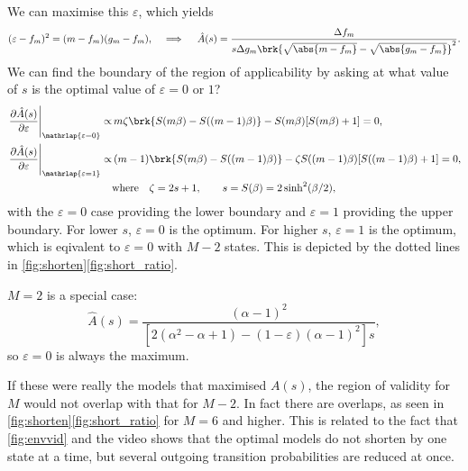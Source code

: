 \documentclass[12pt]{article}
\renewcommand{\pdiff}[2]{\frac{\partial #1}{\partial #2}}
\begin{document}
We can maximise this \wrt \(\varepsilon\), which yields
%
\begin{equation}\label{eq:shortopt}
  (\varepsilon - f_m)^2 = (m - f_m)(g_m - f_m),
  \quad \implies \quad
  \hat{A}(s) = \frac{\Delta f_{m}}
      {s \Delta g_{m} \brk{\sqrt{\abs{m - f_m}} - \sqrt{\abs{g_m - f_m}}}^2}.
\end{equation}
%
We can find the boundary of the region of applicability by asking at what value of \(s\) is the optimal value of \(\varepsilon=0\) or \(1\)?
%
\begin{equation}\label{eq:shortenvalid}
\begin{aligned}
  \left.\pdiff{\hat{A}(s)}{\varepsilon}\right|_{\mathrlap{\varepsilon=0}} \propto &\,
    m \zeta \brk{S(m\beta) - S((m-1)\beta)} - S(m\beta) [S(m\beta) + 1]
      = 0,\\
  \left.\pdiff{\hat{A}(s)}{\varepsilon}\right|_{\mathrlap{\varepsilon=1}} \propto &\,
    (m-1)\brk{S(m\beta) - S((m-1)\beta)} - \zeta S((m-1)\beta) [S((m-1)\beta) + 1]
      = 0,\\
    &\text{where}\quad
    \zeta = 2s + 1, \qquad
    s = S(\beta) = 2 \sinh^2(\beta/2),
\end{aligned}
\end{equation}
%
with the \(\varepsilon=0\) case providing the lower boundary and \(\varepsilon=1\) providing the upper boundary.
For lower \(s\), \(\varepsilon = 0\) is the optimum. 
For higher \(s\), \(\varepsilon = 1\) is the optimum, which is eqivalent to \(\varepsilon = 0\) with \(M-2\) states.
This is depicted by the dotted lines in \cref{fig:shorten}\ref{fig:short_ratio}.

\(M=2\) is a special case:
%
\begin{equation*}
  \hat{A}(s) = \frac{(\alpha-1)^2}
                    {[2(\alpha^2-\alpha+1) - (1-\varepsilon) (\alpha-1)^2]s},
\end{equation*}
%
so \(\varepsilon=0\) is always the maximum.

If these were really the models that maximised \(A(s)\), the region of validity for \(M\) would not overlap with that for \(M-2\).
In fact there are overlaps, as seen in \cref{fig:shorten}\ref{fig:short_ratio} for \(M=6\) and higher.
This is related to the fact that \autoref{fig:envvid} and the video shows that the optimal models do not shorten by one state at a time, but several outgoing transition probabilities are reduced at once.

\end{document}
